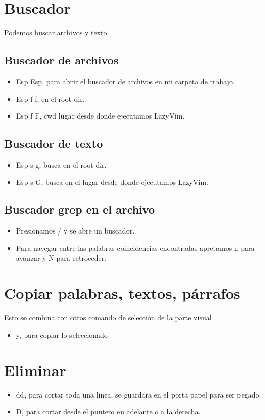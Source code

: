 \section{Buscador}
Podemos buscar archivos y texto.
\subsection{Buscador de archivos}
\begin{itemize}
  \item Esp Esp, para abrir el buscador de archivos en mi carpeta de trabajo.
  \item Esp f f, en el root dir.
  \item Esp f F, cwd lugar desde donde ejecutamos LazyVim.
\end{itemize}
\subsection{Buscador de texto}
\begin{itemize}
	\item Esp s g, busca en el root dir.
	\item Esp s G, busca en el lugar desde donde ejecutamos LazyVim.
\end{itemize}
\subsection{Buscador grep en el archivo}
\begin{itemize}
  \item Presionamos / y se abre un buscador.
  \item Para navegar entre las palabras coincidencias encontradas apretamos n para avanzar y N para retroceder.
\end{itemize}
\section{Copiar palabras, textos, párrafos}
Esto se combina con otros comando de selección de la parte visual
\begin{itemize}
  \item y, para copiar lo seleccionado
\end{itemize}
\section{Eliminar}
\begin{itemize}
  \item dd, para cortar toda una linea, se guardara en el porta papel para ser pegado.
  \item D, para cortar desde el puntero en adelante o a la derecha.
\end{itemize}


